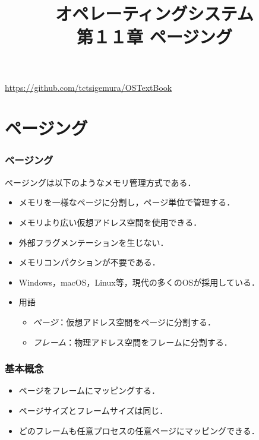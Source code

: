 \documentclass[unicode,handout]{beamer}                   %
\begin{document}
\title[ページング]
      {オペレーティングシステム\\第１１章 ページング}
\date{}
\begin{frame}
  \titlepage
  \centerline{\url{https://github.com/tctsigemura/OSTextBook}}
\end{frame}


\section{ページング}
\begin{frame}
  \frametitle{ページング}
  ページングは以下のようなメモリ管理方式である．
  \begin{itemize}
  \item メモリを一様なページに分割し，ページ単位で管理する．
  \item メモリより広い仮想アドレス空間を使用できる．
  \item 外部フラグメンテーションを生じない．
  \item メモリコンパクションが不要である．
  \item Windows，macOS，Linux等，現代の多くのOSが採用している．
  \item 用語
    \begin{itemize}
      \item \emph{ページ}：仮想アドレス空間をページに分割する．
      \item \emph{フレーム}：物理アドレス空間をフレームに分割する．
    \end{itemize}
  \end{itemize}
\end{frame}

\begin{frame}
  \frametitle{基本概念}
  \begin{itemize}
  \item ページをフレームにマッピングする．
  \item ページサイズとフレームサイズは同じ．
  \item どのフレームも任意プロセスの任意ページにマッピングできる．
  \end{itemize}
\end{frame}
\end{document}
